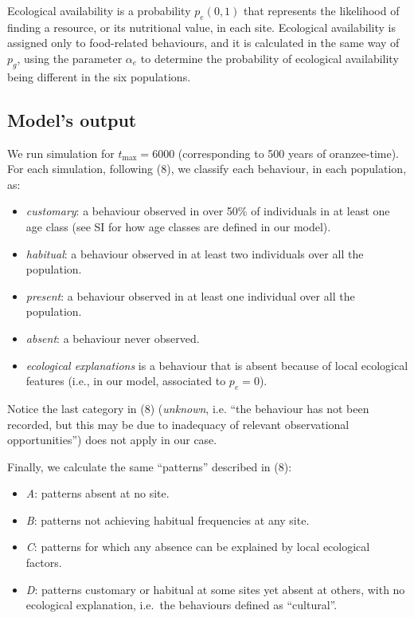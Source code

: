 \documentclass[9pt,twocolumn,twoside,]{pnas-new}
\begin{document}
Ecological availability is a probability \(p_e(0,1)\) that represents
the likelihood of finding a resource, or its nutritional value, in each
site. Ecological availability is assigned only to food-related
behaviours, and it is calculated in the same way of \(p_g\), using the
parameter \(\alpha_e\) to determine the probability of ecological
availability being different in the six populations.

\subsection*{Model's output}\label{format}

We run simulation for \(t_\text{max}=6000\) (corresponding to 500 years
of oranzee-time). For each simulation, following (8), we classify each
behaviour, in each population, as:

\begin{itemize}
\item
  \emph{customary}: a behaviour observed in over 50\% of individuals in
  at least one age class (see SI for how age classes are defined in our
  model).
\item
  \emph{habitual}: a behaviour observed in at least two individuals over
  all the population.
\item
  \emph{present}: a behaviour observed in at least one individual over
  all the population.
\item
  \emph{absent}: a behaviour never observed.
\item
  \emph{ecological explanations} is a behaviour that is absent because
  of local ecological features (i.e., in our model, associated to
  \(p_e=0\)).
\end{itemize}

Notice the last category in (8) (\emph{unknown}, i.e. ``the behaviour
has not been recorded, but this may be due to inadequacy of relevant
observational opportunities'') does not apply in our case.

Finally, we calculate the same ``patterns'' described in (8):

\begin{itemize}
\item
  \emph{A}: patterns absent at no site.
\item
  \emph{B}: patterns not achieving habitual frequencies at any site.
\item
  \emph{C}: patterns for which any absence can be explained by local
  ecological factors.
\item
  \emph{D}: patterns customary or habitual at some sites yet absent at
  others, with no ecological explanation, i.e.~the behaviours defined as
  ``cultural''.
\end{itemize}
\end{document}
